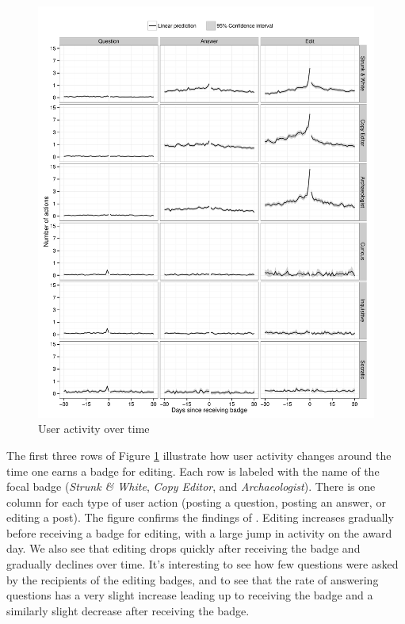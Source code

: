 \documentclass[conference]{IEEEtran}
\newcommand{\1}{\mathds{1}}
\begin{document}
\begin{figure}
  \centering
  \includegraphics[width=\textwidth]{../figures/badges.pdf}
  \caption{User activity over time \label{fig:badges}}
\end{figure}

The first three rows of Figure \ref{fig:badges} illustrate how user activity changes around the time one earns a badge for editing. Each row is labeled with the name of the focal badge (\textit{Strunk \& White}, \textit{Copy Editor}, and \textit{Archaeologist}). There is one column for each type of user action (posting a question, posting an answer, or editing a post). The figure confirms the findings of \citet{Grant2013}. Editing increases gradually before receiving a badge for editing, with a large jump in activity on the award day. We also see that editing drops quickly after receiving the badge and gradually declines over time. It's interesting to see how few questions were asked by the recipients of the editing badges, and to see that the rate of answering questions has a very slight increase leading up to receiving the badge and a similarly slight decrease after receiving the badge.
\end{document}

